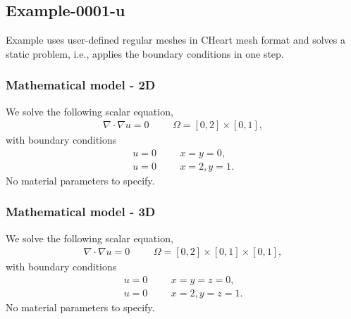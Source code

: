 %
\clearpage
%
\subsection{Example-0001-u}
%
Example uses user-defined regular meshes in CHeart mesh format
and solves a static problem, i.e., applies the boundary conditions in one step.
%
%
\subsubsection{Mathematical model - 2D}
%
We solve the following scalar equation,
%
\begin{align}
    \nabla \cdot \nabla u = 0 & &&\Omega = [0, 2] \times [0, 1],
\end{align}
%
with boundary conditions
%
\begin{align}
    u = 0 & &&x = y = 0, \\
    u = 0 & &&x = 2, y = 1.
\end{align}
%
No material parameters to specify.
%
%
\subsubsection{Mathematical model - 3D}
%
We solve the following scalar equation,
%
\begin{align}
    \nabla \cdot \nabla u = 0 & &&\Omega = [0, 2] \times [0, 1] \times [0, 1],
\end{align}
%
with boundary conditions
%
\begin{align}
    u = 0 & &&x = y = z = 0, \\
    u = 0 & &&x = 2, y = z = 1.
\end{align}
%
No material parameters to specify.
%
%
